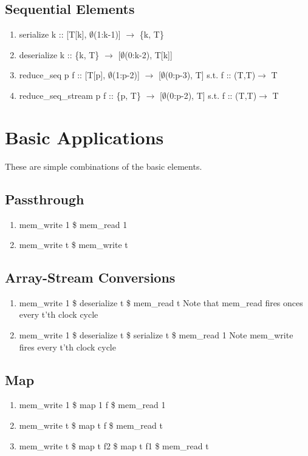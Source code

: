 \documentclass[11pt,fleqn]{article}
\numberwithin{equation}{subsection}
\begin{document}
\subsection{Sequential Elements}

\begin{enumerate}
    \item serialize k :: [T[k], $\emptyset$(1:k-1)] $\rightarrow$ \{k, T\}
    \item deserialize k :: \{k, T\} $\rightarrow$ [$\emptyset$(0:k-2), T[k]]
    \item reduce\_seq p f :: [T[p], $\emptyset$(1:p-2)] $\rightarrow$ [$\emptyset$(0:p-3), T]
        \subitem s.t. f :: (T,T)$\rightarrow$ T
    \item reduce\_seq\_stream p f :: \{p, T\} $\rightarrow$ [$\emptyset$(0:p-2), T]
        \subitem s.t. f :: (T,T)$\rightarrow$ T
\end{enumerate}

\section{Basic Applications}
These are simple combinations of the basic elements.

\subsection{Passthrough}
\begin{enumerate}
    \item mem\_write 1 \$ mem\_read 1
    \item mem\_write t \$ mem\_write t 
\end{enumerate}

\subsection{Array-Stream Conversions}
\begin{enumerate}
    \item mem\_write 1 \$ deserialize t \$ mem\_read t
        \subitem Note that mem\_read fires onces every t'th clock cycle
    \item mem\_write 1 \$ deserialize t \$ serialize t \$ mem\_read 1
        \subitem Note mem\_write fires every t'th clock cycle
\end{enumerate}

\subsection{Map}
\begin{enumerate}
    \item mem\_write 1 \$ map 1 f \$ mem\_read 1
    \item mem\_write t \$ map t f \$ mem\_read t
    \item mem\_write t \$ map t f2 \$ map t f1 \$ mem\_read t
\end{enumerate}
\end{document}
